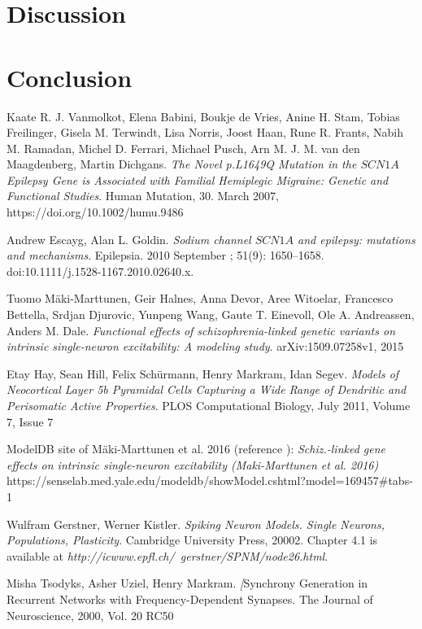 \documentclass[twocolumn, a4paper,10pt, norsk]{scrartcl}
\begin{document}
\section*{Discussion}

\section*{Conclusion}


\begin{thebibliography}{9}
Kaate R. J. Vanmolkot, Elena Babini, Boukje de Vries, Anine H. Stam, Tobias Freilinger, Gisela M. Terwindt, Lisa Norris, Joost Haan, Rune R. Frants, Nabih M. Ramadan, Michel D. Ferrari, Michael Pusch, Arn M. J. M. van den Maagdenberg, Martin Dichgans.
\textit{The Novel p.L1649Q Mutation in the $SCN1A$ Epilepsy Gene is Associated with Familial Hemiplegic Migraine: Genetic and Functional Studies}. 
Human Mutation, 30. March 2007,
https://doi.org/10.1002/humu.9486

Andrew Escayg, Alan L. Goldin.
\textit{Sodium channel $SCN1A$ and epilepsy: mutations and mechanisms}. 
Epilepsia. 2010 September ; 51(9): 1650–1658. doi:10.1111/j.1528-1167.2010.02640.x.

Tuomo M\"aki-Marttunen, Geir Halnes, Anna Devor, Aree Witoelar, Francesco Bettella, Srdjan Djurovic, Yunpeng Wang, Gaute T. Einevoll, Ole A. Andreassen, Anders M. Dale.
\textit{Functional effects of schizophrenia-linked genetic variants on intrinsic single-neuron excitability: A modeling study}. 
arXiv:1509.07258v1, 2015

Etay Hay, Sean Hill, Felix Sch\"urmann, Henry Markram, Idan Segev.
\textit{Models of Neocortical Layer 5b Pyramidal Cells Capturing a Wide Range of Dendritic and Perisomatic Active Properties}. 
PLOS Computational Biology, July 2011, Volume 7, Issue 7


ModelDB site of M\"aki-Marttunen et al. 2016 (reference \cite{gautes}):
\textit{Schiz.-linked gene effects on intrinsic single-neuron excitability (Maki-Marttunen et al. 2016)}
https://senselab.med.yale.edu/modeldb/showModel.cshtml?model=169457\#tabs-1


Wulfram Gerstner, Werner Kistler.
\textit{Spiking Neuron Models. Single Neurons, Populations, Plasticity}.
Cambridge University Press, 20002.
Chapter 4.1 is available at \textit{http://icwww.epfl.ch/~gerstner/SPNM/node26.html}.



Misha Tsodyks, Asher Uziel, Henry Markram.
\textit[{Synchrony Generation in Recurrent Networks with Frequency-Dependent Synapses}.
The Journal of Neuroscience, 2000, Vol. 20 RC50


\end{thebibliography}
\end{document}

